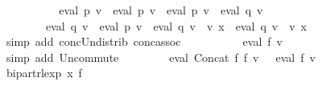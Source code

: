 \begin{isabellebody}
\ \ \ \ \isamarkupfalse%
\ \isamarkupfalse%
\ {\isachardoublequoteopen}{\isasymdots}\ {\isacharequal}{\kern0pt}\ {\isasymPsi}\ {\isacharparenleft}{\kern0pt}eval\ p{}\ v\ {\isacharat}{\kern0pt}{\isacharat}{\kern0pt}\ eval\ p{}\ v\ {\isasymunion}\ {\isacharparenleft}{\kern0pt}eval\ p{}\ v\ {\isacharat}{\kern0pt}{\isacharat}{\kern0pt}\ eval\ q{}\ v\ {\isasymunion}\isanewline
\ \ \ \ \ \ \ \ eval\ q{}\ v\ {\isacharat}{\kern0pt}{\isacharat}{\kern0pt}\ eval\ p{}\ v\ {\isasymunion}\ eval\ q{}\ v\ {\isacharat}{\kern0pt}{\isacharat}{\kern0pt}\ v\ x\ {\isacharat}{\kern0pt}{\isacharat}{\kern0pt}\ eval\ q{}\ v{\isacharparenright}{\kern0pt}\ {\isacharat}{\kern0pt}{\isacharat}{\kern0pt}\ v\ x{\isacharparenright}{\kern0pt}{\isachardoublequoteclose}\isanewline
\ \ \ \ \ \ \isamarkupfalse%
\ {\isacharparenleft}{\kern0pt}simp\ add{\isacharcolon}{\kern0pt}\ conc{\isacharunderscore}{\kern0pt}Un{\isacharunderscore}{\kern0pt}distrib{\isacharparenleft}{\kern0pt}{}{\isacharparenright}{\kern0pt}\ conc{\isacharunderscore}{\kern0pt}assoc{\isacharparenright}{\kern0pt}\isanewline
\ \ \ \ \isamarkupfalse%
\ \isamarkupfalse%
\ {\isachardoublequoteopen}{\isasymdots}\ {\isacharequal}{\kern0pt}\ {\isasymPsi}\ {\isacharparenleft}{\kern0pt}eval\ {\isacharquery}{\kern0pt}f{\isacharprime}{\kern0pt}\ v{\isacharparenright}{\kern0pt}{\isachardoublequoteclose}\isanewline
\ \ \ \ \ \ \isamarkupfalse%
\ {\isacharparenleft}{\kern0pt}simp\ add{\isacharcolon}{\kern0pt}\ Un{\isacharunderscore}{\kern0pt}commute{\isacharparenright}{\kern0pt}\isanewline
\ \ \ \ \isamarkupfalse%
\ \isamarkupfalse%
\ {\isachardoublequoteopen}{\isasymPsi}\ {\isacharparenleft}{\kern0pt}eval\ {\isacharparenleft}{\kern0pt}Concat\ f{}\ f{}{\isacharparenright}{\kern0pt}\ v{\isacharparenright}{\kern0pt}\ {\isacharequal}{\kern0pt}\ {\isasymPsi}\ {\isacharparenleft}{\kern0pt}eval\ {\isacharquery}{\kern0pt}f{\isacharprime}{\kern0pt}\ v{\isacharparenright}{\kern0pt}{\isachardoublequoteclose}\ \isakeywordONE{{\isachardot}{\kern0pt}}\isamarkupfalse%
\isanewline
\ \ \isamarkupfalse%
\isanewline
\ \ \isamarkupfalse%
\ \isamarkupfalse%
\ {\isachardoublequoteopen}bipart{\isacharunderscore}{\kern0pt}rlexp\ x\ {\isacharquery}{\kern0pt}f{\isacharprime}{\kern0pt}{\isachardoublequoteclose}\ \isamarkupfalse%

\end{isabellebody}
